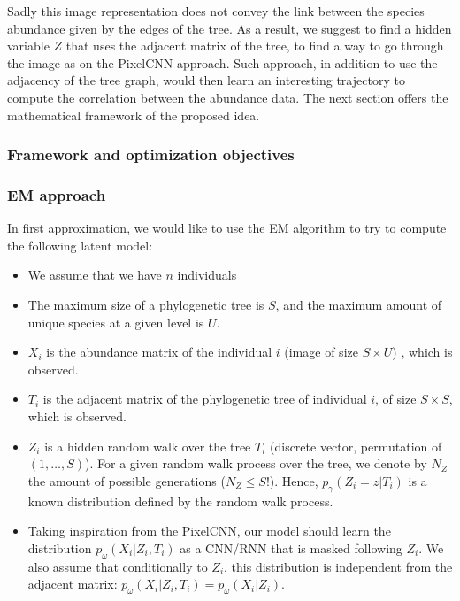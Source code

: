 Sadly this image representation does not convey the link between the species abundance given by the edges of the tree.
As a result, we suggest to find a hidden variable $Z$ that uses the adjacent matrix of the tree, to find a way to go through the image
as on the PixelCNN approach.
Such approach, in addition to use the adjacency of the tree graph, would then learn an interesting trajectory to compute the correlation between the abundance data.
The next section offers the mathematical framework of the proposed idea.

\subsubsection{Framework and optimization objectives}

\subsubsection{EM approach}

In first approximation, we would like to use the EM algorithm to try to compute the following latent model:
\begin{itemize}
    \item We assume that we have $n$ individuals
    \item The maximum size of a phylogenetic tree is $S$, and the maximum amount of unique species at a given level is $U$.
    \item $X_i$ is the abundance matrix of the individual $i$ (image of size $S \times U$) , which is observed.
    \item $T_i$ is the adjacent matrix of the phylogenetic tree of individual $i$, of size $S \times S$, which is observed.
    \item $Z_i$ is a hidden random walk over the tree $T_i$ (discrete vector, permutation of $(1, \dots, S)$).
          For a given random walk process over the tree, we denote by $N_{Z}$ the amount of possible generations ($N_Z \leq S!$).
          Hence, $p_{\gamma}(Z_i = z | T_i)$ is a known distribution defined by the random walk process.
    \item Taking inspiration from the PixelCNN, our model should learn the distribution $p_{\omega}(X_i | Z_i, T_i)$ as a CNN/RNN that is masked following $Z_i$.
          We also assume that conditionally to $Z_i$, this distribution is independent from the adjacent matrix: $p_{\omega}(X_i | Z_i, T_i) = p_{\omega}(X_i | Z_i)$.
\end{itemize}

